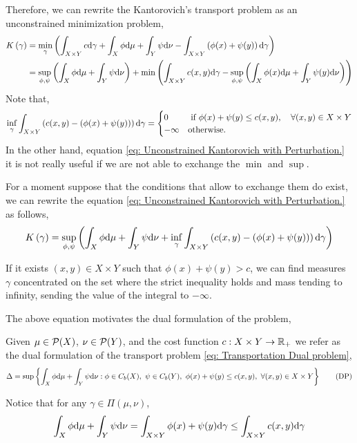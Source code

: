Therefore, we can rewrite the Kantorovich's transport problem as an unconstrained minimization problem,    
\begin{align}
	K\left(\gamma\right)&=\min_{\gamma}\left( \int_{X\times Y} c\mathrm{d}\gamma +\int_{X} \phi \mathrm{d}\mu +\int_{Y} \psi\mathrm{d}\nu - \int_{X\times Y}\left( \phi(x)+\psi(y) \right)\mathrm{d}\gamma \right) \\
	&=\sup_{\phi,\psi}\left(  \int_{X}\phi\mathrm{d}\mu+\int_{Y}\psi\mathrm{d}\nu \right)+\min\left( \int_{X\times Y}c(x,y)\mathrm{d}\gamma-\sup_{\phi, \psi}\left( \int_{X}\phi(x)\mathrm{d}\mu+\int_{Y}\psi(y)\mathrm{d}\nu \right) \right) \label{eq: Unconstrained Kantorovich with Perturbation.}
\end{align}
Note that,
\begin{equation}
 \inf_{\gamma}\int_{X\times Y}\left( c(x,y)-\left( \phi(x)+\psi(y) \right) \right) \mathrm{d} \gamma =\begin{cases}
	0 & \text{ if } \phi(x)+\psi(y)\leq c(x,y),\quad \forall (x,y)\in X\times Y \\
	-\infty & \text{otherwise}.
 \end{cases}
\end{equation}
In the other hand, equation \eqref{eq: Unconstrained Kantorovich with Perturbation.} it is not really useful if we are not able to exchange the $\min$ and $\sup$. 

For a moment suppose that the conditions that allow to exchange them do exist, we can rewrite the equation \eqref{eq: Unconstrained Kantorovich with Perturbation.} as follows,
\begin{equation}
	K\left(\gamma\right)=\sup_{\phi, \psi}\left( \int_{X}\phi\mathrm{d}\mu+\int_{Y}\psi\mathrm{d}\nu+\inf_{\gamma}\int_{X\times Y}\left( c(x,y)-\left( \phi(x)+\psi(y) \right) \right)\mathrm{d}\gamma \right)
\end{equation}

If it exists $(x,y) \in X\times Y$ such that $\phi(x)+\psi(y)>c$, we can find measures $\gamma$ concentrated on the set where the strict inequality holds and mass tending to infinity, sending the value of the integral to $-\infty$.  

The above equation motivates the dual formulation of the problem,

\begin{problem}
Given $\mu\in\mathcal{P}(X)$, $\nu\in\mathcal{P}(Y)$, and the cost function $c:X\times Y\rightarrow \mathbb{R}_+$ we refer as the dual formulation of the transport problem \eqref{eq: Transportation Dual problem},
\begin{equation}
\Delta=\sup\braces{\int_X\phi\dmu+\int_Y\psi \dnu: \phi \in C_b(X),\ \psi \in C_b(Y),\ \phi(x)+\psi(y)\leq c(x,y),\ \forall (x,y)\in X\times Y} \tag{DP} \label{eq: Transportation Dual problem}
\end{equation}	
\end{problem}
Notice that for any $\gamma\in \Pi(\mu, \nu)$,
\begin{equation}
	\int_{X}\phi\mathrm{d}\mu+\int_{Y}\psi\mathrm{d}\nu=\int_{X\times Y} \phi(x)+\psi(y)\mathrm{d} \gamma \leq \int_{X\times Y} c(x,y)\mathrm{d} \gamma
\end{equation}

